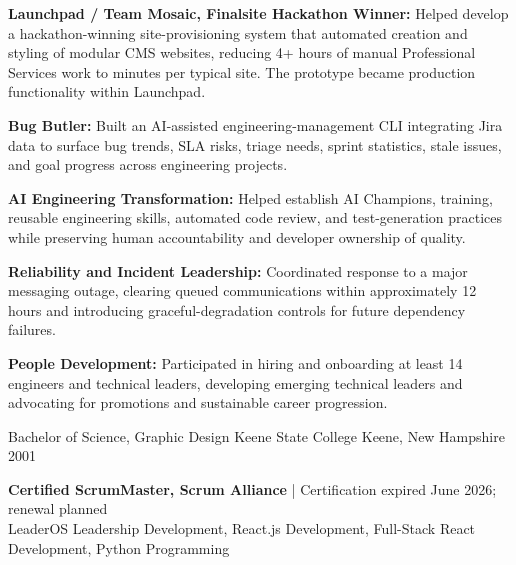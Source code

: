 \documentclass[12pt, letterpaper]{awesome-cv}
\begin{document}
\begin{cvparagraph}
\textbf{Launchpad / Team Mosaic, Finalsite Hackathon Winner:} Helped develop a hackathon-winning site-provisioning system that automated creation and styling of modular CMS websites, reducing 4+ hours of manual Professional Services work to minutes per typical site. The prototype became production functionality within Launchpad.

\textbf{Bug Butler:} Built an AI-assisted engineering-management CLI integrating Jira data to surface bug trends, SLA risks, triage needs, sprint statistics, stale issues, and goal progress across engineering projects.

\textbf{AI Engineering Transformation:} Helped establish AI Champions, training, reusable engineering skills, automated code review, and test-generation practices while preserving human accountability and developer ownership of quality.

\textbf{Reliability and Incident Leadership:} Coordinated response to a major messaging outage, clearing queued communications within approximately 12 hours and introducing graceful-degradation controls for future dependency failures.

\textbf{People Development:} Participated in hiring and onboarding at least 14 engineers and technical leaders, developing emerging technical leaders and advocating for promotions and sustainable career progression.
\end{cvparagraph}

\begin{cventries}
  \cventry
    {Bachelor of Science, Graphic Design}
    {Keene State College}
    {Keene, New Hampshire}
    {2001}
    {}
\end{cventries}

\begin{cvparagraph}
\textbf{Certified ScrumMaster, Scrum Alliance} | Certification expired June 2026; renewal planned\\
LeaderOS Leadership Development, React.js Development, Full-Stack React Development, Python Programming
\end{cvparagraph}
\end{document}
